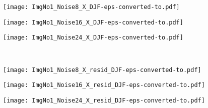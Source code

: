 \documentclass{article}
\begin{document}
\begin{figure*}[th]
\begin{multicols}{2}
\begin{minipage}[b]{0.1\linewidth}
		\end{minipage} 
		\begin{minipage}[b]{0.28\linewidth}
			\centering
			\texttt{[image: ImgNo1\_Noise8\_X\_DJF-eps-converted-to.pdf]}
		\end{minipage} 
		\begin{minipage}[b]{0.28\linewidth}
			\centering
			\texttt{[image: ImgNo1\_Noise16\_X\_DJF-eps-converted-to.pdf]}
		\end{minipage} 
		\begin{minipage}[b]{0.28\linewidth}
			\centering
			\texttt{[image: ImgNo1\_Noise24\_X\_DJF-eps-converted-to.pdf]}
		\end{minipage} 
		\\
		\begin{minipage}[b]{0.1\linewidth}
		\end{minipage}  
		\begin{minipage}[b]{0.28\linewidth}
			\centering
			\texttt{[image: ImgNo1\_Noise8\_X\_resid\_DJF-eps-converted-to.pdf]}
		\end{minipage} 
		\begin{minipage}[b]{0.28\linewidth}
			\centering
			\texttt{[image: ImgNo1\_Noise16\_X\_resid\_DJF-eps-converted-to.pdf]}
		\end{minipage} 
		\begin{minipage}[b]{0.28\linewidth}
			\centering
			\texttt{[image: ImgNo1\_Noise24\_X\_resid\_DJF-eps-converted-to.pdf]}
		\end{minipage} 
		\\

\end{multicols}
\end{figure*}
\end{document}
